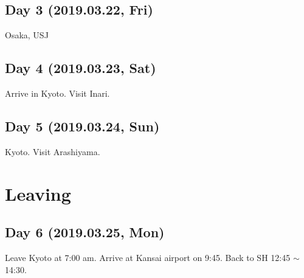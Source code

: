 \documentclass{article}
\begin{document}
\subsection{Day 3 (2019.03.22, Fri)}
Osaka, USJ

\subsection{Day 4 (2019.03.23, Sat)}
Arrive in Kyoto.
Visit Inari.

\subsection{Day 5 (2019.03.24, Sun)}
Kyoto. Visit Arashiyama.

\section{Leaving}
\subsection{Day 6 (2019.03.25, Mon)}
Leave Kyoto at 7:00 am.
Arrive at Kansai airport on 9:45.
Back to SH 12:45 $\sim $ 14:30.
\end{document}
